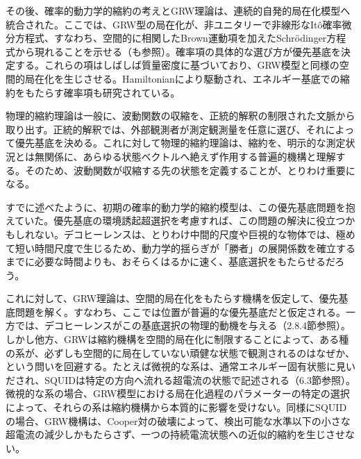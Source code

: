 その後、確率的動力学的縮約の考えとGRW理論は、連続的自発的局在化模型へ統合された\cite{ref451,ref452}。ここでは、GRW型の局在化が、非ユニタリーで非線形なItô確率微分方程式、すなわち、空間的に相関したBrown運動項を加えたSchrödinger方程式から現れることを示せる（\cite{ref191,ref453}も参照）。確率項の具体的な選び方が優先基底を決定する。これらの項はしばしば質量密度に基づいており、GRW模型と同様の空間的局在化を生じさせる\cite{ref451,ref452,ref453}。Hamiltonianにより駆動され、エネルギー基底での縮約をもたらす確率項も研究されている\cite{ref454,ref455,ref456,ref457,ref458,ref459,ref460,ref461,ref462,ref463}。

物理的縮約理論は一般に、波動関数の収縮を、正統的解釈の制限された文脈から取り出す。正統的解釈では、外部観測者が測定観測量を任意に選び、それによって優先基底を決める。これに対して物理的縮約理論は、縮約を、明示的な測定状況とは無関係に、あらゆる状態ベクトルへ絶えず作用する普遍的機構と理解する。そのため、波動関数が収縮する先の状態を定義することが、とりわけ重要になる。

すでに述べたように、初期の確率的動力学的縮約模型は、この優先基底問題を抱えていた。優先基底の環境誘起超選択を考慮すれば、この問題の解決に役立つかもしれない。デコヒーレンスは、とりわけ中間的尺度や巨視的な物体では、極めて短い時間尺度で生じるため、動力学的揺らぎが「勝者」の展開係数を確立するまでに必要な時間よりも、おそらくはるかに速く、基底選択をもたらせるだろう。


\hypertarget{srcpage:350}{}\label{srcpage:350}
これに対して、GRW理論は、空間的局在化をもたらす機構を仮定して、優先基底問題を解く。すなわち、ここでは位置が普遍的な優先基底だと仮定される。一方では、デコヒーレンスがこの基底選択の物理的動機を与える（2.8.4節参照）。しかし他方、GRWは縮約機構を空間的局在化に制限することによって、ある種の系が、必ずしも空間的に局在していない頑健な状態で観測されるのはなぜか、という問いを回避する。たとえば微視的な系は、通常エネルギー固有状態に見いだされ、SQUIDは特定の方向へ流れる超電流の状態で記述される（6.3節参照）。微視的な系の場合、GRW模型における局在化過程のパラメーターの特定の選択によって、それらの系は縮約機構から本質的に影響を受けない。同様にSQUIDの場合、GRW機構は、Cooper対の破壊によって、検出可能な水準以下の小さな超電流の減少しかもたらさず、一つの持続電流状態への近似的縮約を生じさせない\cite{ref444,ref464,ref465}。

